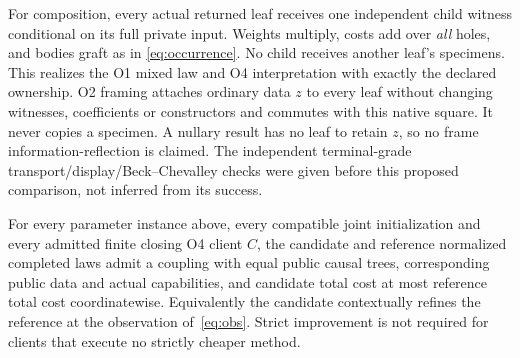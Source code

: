 For composition, every actual returned leaf receives one independent
child witness conditional on its full private input. Weights multiply,
costs add over \emph{all} holes, and bodies graft as in
\eqref{eq:occurrence}. No child receives another leaf's specimens.
This realizes the O1 mixed law and O4 interpretation with exactly the
declared ownership. O2 framing attaches ordinary data $z$ to every leaf
without changing witnesses, coefficients or constructors and commutes
with this native square. It never copies a specimen. A nullary result
has no leaf to retain $z$, so no frame information-reflection is claimed.
The independent terminal-grade transport/display/Beck--Chevalley checks
were given before this proposed comparison, not inferred from its success.

\begin{theorem}\label{thm:A}
For every parameter instance above, every compatible joint initialization
and every admitted finite closing O4 client $C$, the candidate and
reference normalized completed laws admit a coupling with equal public
causal trees, corresponding public data and actual capabilities, and
candidate total cost at most reference total cost coordinatewise.
Equivalently the candidate contextually refines the reference at the
observation of~\eqref{eq:obs}. Strict improvement is not required for
clients that execute no strictly cheaper method.
\end{theorem}
